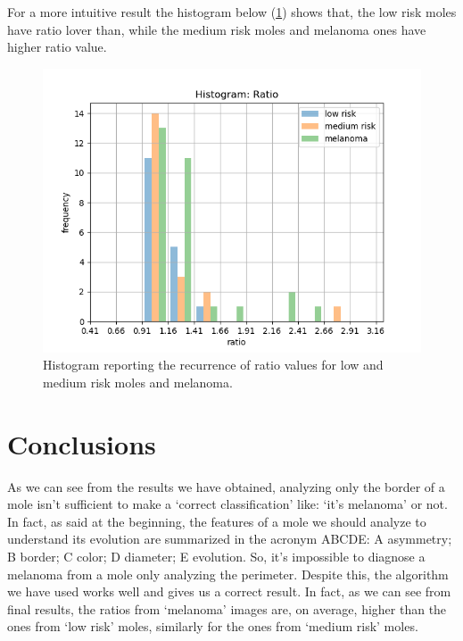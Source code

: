 \documentclass[a4paper,12pt,oneside,titlepage]{article}
\begin{document}
	For a more intuitive result the histogram below (\ref{histo}) shows that, the low risk moles have ratio lover than, while the medium risk moles and melanoma ones have higher ratio value.
	
	
	\begin{figure}[h!]
		\centering
		\includegraphics[scale=0.35]{histograph.png}
		
		\caption{Histogram reporting the recurrence of ratio values for low and medium risk moles and melanoma.}
		\label{histo}
	\end{figure}
	
	
	\section{Conclusions}
	As we can see from the results we have obtained, analyzing only the border of a mole isn’t sufficient to make a ‘correct classification’ like: ‘it’s melanoma’ or not. In fact, as said at the beginning, the features of a mole we should analyze to understand its evolution are summarized in the acronym ABCDE: A asymmetry; B border; C color; D diameter; E evolution. So, it’s impossible to diagnose a melanoma from a mole only analyzing the perimeter. Despite this, the algorithm we have used works well and gives us a correct result. In fact, as we can see from final results, the ratios from ‘melanoma’ images are, on average, higher than the ones from ‘low risk’ moles, similarly for the ones from ‘medium risk’ moles.
	
	
	
	
\end{document}
